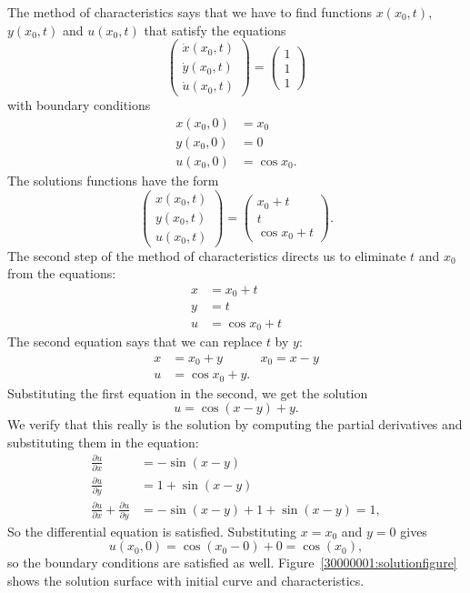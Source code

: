 \begin{loesung}
The method of characteristics says that we have to find functions
$x(x_0, t)$, $y(x_0,t)$ and $u(x_0,t)$ that satisfy the equations
\[
\begin{pmatrix}
\dot x(x_0,t)\\
\dot y(x_0,t)\\
\dot u(x_0,t)
\end{pmatrix}
=\begin{pmatrix}
1\\1\\1
\end{pmatrix}
\]
with boundary conditions
\begin{align*}
x(x_0,0)&=x_0\\
y(x_0,0)&=0\\
u(x_0,0)&=\cos x_0.
\end{align*}
The solutions functions have the form
\[
\begin{pmatrix}
x(x_0,t)\\
y(x_0,t)\\
u(x_0,t)
\end{pmatrix}
=
\begin{pmatrix}
x_0+t\\
t\\
\cos x_0 + t
\end{pmatrix}.
\]
The second step of the method of characteristics directs us to
eliminate $t$ and $x_0$ from the equations:
\begin{align*}
x&=x_0+t\\
y&=t\\
u&=\cos x_0 + t
\end{align*}
The second equation says that we can replace $t$ by $y$:
\begin{align*}
x&=x_0+y&x_0=x-y\\
u&=\cos x_0 + y.
\end{align*}
Substituting the first equation in the second, we get the solution
\[
u=\cos(x-y)+y.
\]
We verify that this really is the solution by computing the
partial derivatives and substituting them in the equation:
\begin{align*}
\frac{\partial u}{\partial x}
&=
-\sin(x-y)
\\
\frac{\partial u}{\partial y}
&=
1+\sin(x-y)
\\
\frac{\partial u}{\partial x}
+
\frac{\partial u}{\partial y}
&=
-\sin(x-y)
+
1+\sin(x-y)
=1,
\end{align*}
So the differential equation is satisfied.
Substituting $x=x_0$ and $y=0$ gives
\[
u(x_0,0) = \cos(x_0-0)+0 = \cos(x_0),
\]
so the boundary conditions are satisfied as well.
Figure~\ref{30000001:solutionfigure} shows the solution surface
with initial curve and characteristics.
\end{loesung}

